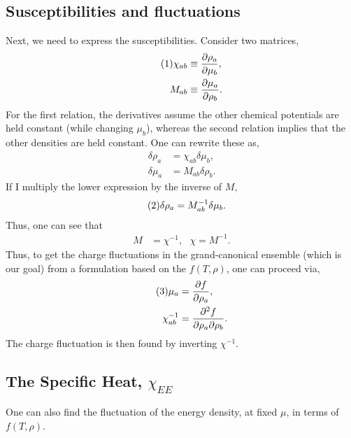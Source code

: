 \documentclass[12pt]{article}
\numberwithin{equation}{section}
\numberwithin{figure}{section}
\newcommand\eqnumber{\addtocounter{equation}{1}\tag{\theequation}}
\begin{document}
\subsection{Susceptibilities and fluctuations}

Next, we need to express the susceptibilities. Consider two matrices,
\begin{align*}\eqnumber
\chi_{ab}&\equiv\frac{\partial\rho_a}{\partial\mu_b},\\
M_{ab}&\equiv\frac{\partial\mu_a}{\partial\rho_b}.
\end{align*}
For the first relation, the derivatives assume the other chemical potentials are held constant (while changing $\mu_b$), whereas the second relation implies that the other densities are held constant. One can rewrite these as,
\begin{align*}
\delta\rho_a&=\chi_{ab}\delta\mu_b,\\
\delta\mu_a&=M_{ab}\delta\rho_b.
\end{align*}
If I multiply the lower expression by the inverse of $M$,
\begin{align*}\eqnumber
\delta\rho_a&=M^{-1}_{ab}\delta\mu_b.
\end{align*}
Thus, one can see that
\begin{align*}
M&=\chi^{-1},~~~\chi=M^{-1}.
\end{align*}
Thus, to get the charge fluctuations in the grand-canonical ensemble (which is our goal) from a formulation based on the $f(T,\rho)$, one can proceed via,
\begin{align*}\eqnumber
\mu_a&=\frac{\partial f}{\partial\rho_a},\\
\chi^{-1}_{ab}&=\frac{\partial^2 f}{\partial\rho_a\partial\rho_b}.
\end{align*}
The charge fluctuation is then found by inverting $\chi^{-1}$.

\subsection{The Specific Heat, $\chi_{EE}$}

One can also find the fluctuation of the energy density, at fixed $\mu$, in terms of $f(T,\rho)$.
\end{document}
